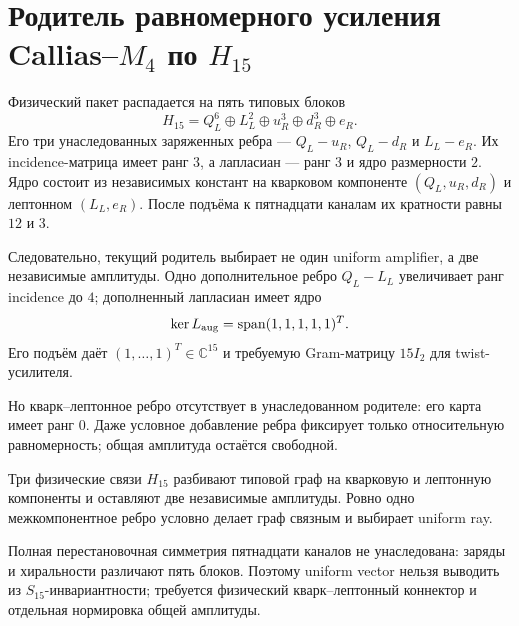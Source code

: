 \chapter{Родитель равномерного усиления
Callias--\texorpdfstring{$M_4$}{M4} по \texorpdfstring{$H_{15}$}{H15}}
\label{ch:v10-callias-m4-uniform-h15-parent}

Физический пакет распадается на пять типовых блоков
\begin{equation}
 H_{15}=Q_L^{6}\oplus L_L^{2}\oplus u_R^{3}\oplus d_R^{3}\oplus e_R.
\end{equation}
Его три унаследованных заряженных ребра --- $Q_L-u_R$, $Q_L-d_R$ и
$L_L-e_R$. Их incidence-матрица имеет ранг $3$, а лапласиан --- ранг
$3$ и ядро размерности $2$. Ядро состоит из независимых констант на
кварковом компоненте $(Q_L,u_R,d_R)$ и лептонном $(L_L,e_R)$.
После подъёма к пятнадцати каналам их кратности равны $12$ и $3$.

Следовательно, текущий родитель выбирает не один uniform amplifier, а две
независимые амплитуды. Одно дополнительное ребро $Q_L-L_L$ увеличивает
ранг incidence до $4$; дополненный лапласиан имеет ядро
\begin{equation}
 \ker L_{\rm aug}=\operatorname{span}(1,1,1,1,1)^T.
\end{equation}
Его подъём даёт $(1,\ldots,1)^T\in\mathbb C^{15}$ и требуемую Gram-матрицу
$15I_2$ для twist-усилителя.

Но кварк--лептонное ребро отсутствует в унаследованном родителе: его карта
имеет ранг $0$. Даже условное добавление ребра фиксирует только
относительную равномерность; общая амплитуда остаётся свободной.

\begin{theorem}
Три физические связи $H_{15}$ разбивают типовой граф на кварковую и
лептонную компоненты и оставляют две независимые амплитуды. Ровно одно
межкомпонентное ребро условно делает граф связным и выбирает uniform ray.
\end{theorem}

\begin{nogocriterion}
Полная перестановочная симметрия пятнадцати каналов не унаследована:
заряды и хиральности различают пять блоков. Поэтому uniform vector нельзя
выводить из $S_{15}$-инвариантности; требуется физический кварк--лептонный
коннектор и отдельная нормировка общей амплитуды.
\end{nogocriterion}

